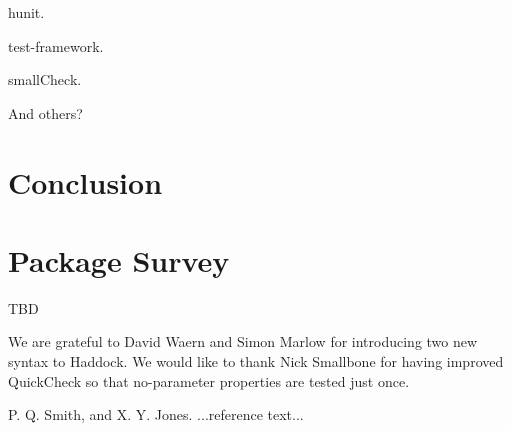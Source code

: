 \documentclass[preprint]{sigplanconf}
\begin{document}
hunit.

test-framework.

smallCheck.

And others?

\section{Conclusion}

\appendix

\section{Package Survey}

TBD

\acks

We are grateful to David Waern and Simon Marlow
for introducing two new syntax to Haddock.
We would like to thank
Nick Smallbone for having improved QuickCheck so that no-parameter properties are tested just once.






\begin{thebibliography}{}
\softraggedright

P. Q. Smith, and X. Y. Jones. ...reference text...

\end{thebibliography}
\end{document}
